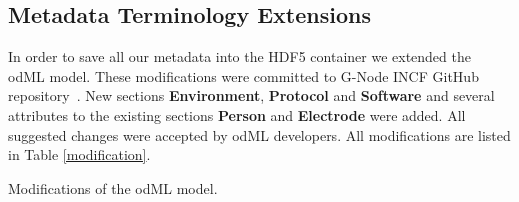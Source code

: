 \documentclass[conference]{IEEEtran}
\begin{document}
 \subsection{Metadata Terminology Extensions}
 \label{meta_adjustments}
 In order to save all our metadata into the HDF5 container we extended the odML model. These modifications were committed to G-Node INCF GitHub repository~\cite{odmlgithub}. New sections \textbf{Environment}, \textbf{Protocol} and \textbf{Software} and several attributes to the existing sections \textbf{Person} and \textbf{Electrode} were added. All suggested changes were accepted by odML developers. All modifications are listed in Table \ref{modification}.
 	\begin{savenotes}
 \begin{table}

 \caption{Modifications of the odML model.}
 	\label{modification}


\end{table}
\end{savenotes}
\end{document}

